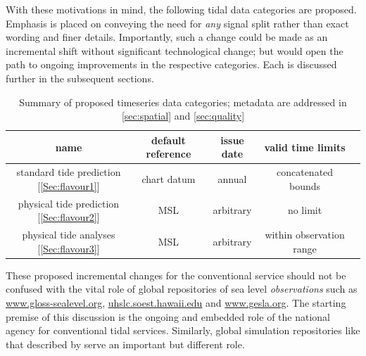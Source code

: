 With these motivations in mind, the following tidal data categories are proposed.   Emphasis is placed on conveying the need for \textit{any} signal split rather than exact wording and finer details.  Importantly, such a change could be made as an incremental shift without significant technological change; but would open the path to ongoing improvements in the respective categories. 
Each is discussed further in the subsequent sections.

\begin{table}[H]\centering
    \begin{tabular}{ |c|c|c|c|c| }
    \hline
    name    & 
        default reference  & 
        issue date         & 
        valid time limits  \\
    \hline
    standard tide prediction [\ref{Sec:flavour1}] & 
        chart datum & annual & 
        concatenated bounds\\
    \hline
    physical tide prediction [\ref{Sec:flavour2}]& 
        MSL       & 
        arbitrary & 
        no limit \\
    \hline
    physical tide analyses [\ref{Sec:flavour3}]& 
        MSL       & 
        arbitrary & 
        within observation range \\
    \hline
    \end{tabular}
    \caption{Summary of proposed timeseries data categories; metadata are addressed in \ref{sec:spatial} and \ref{sec:quality} }
    \label{tab:typesSummary}
\end{table}
These proposed incremental changes for the conventional service should not be confused with the vital role of global repositories of sea level \textit{observations} such as  \url{www.gloss-sealevel.org}, \url{uhslc.soest.hawaii.edu} and \url{www.gesla.org}.    The starting premise of this discussion is the ongoing and embedded role of the national agency for conventional tidal services.    
Similarly, global simulation repositories like that described by \citeauthor{10.3389/fmars.2020.00263}
serve an important but different role.

